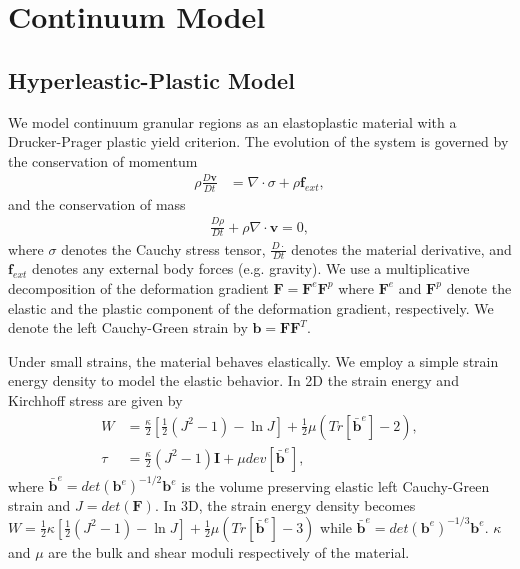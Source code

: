 \chapter{Continuum Model}

\section{Hyperleastic-Plastic Model} \label{hyperelastic_model}
We model continuum granular regions as an elastoplastic material with a Drucker-Prager plastic yield criterion. The evolution of the system is governed by the conservation of momentum
\begin{align}
\rho \frac{D \bm{v}}{D t} &= \nabla \cdot \sigma + \rho \bm{f}_{ext} ,
\end{align}
and the conservation of mass
\begin{align}
\frac{D \rho}{D t} + \rho \nabla \cdot \bm{v} = 0 ,
\end{align}
where $\sigma$ denotes the Cauchy stress tensor, $\frac{D \cdot}{D t}$ denotes the material derivative, and $\bm{f}_{ext}$ denotes any external body forces (e.g. gravity). We use a multiplicative decomposition of the deformation gradient $\boldsymbol{F} = \boldsymbol{F}^e \boldsymbol{F}^p$ where $\boldsymbol{F}^e$ and $\boldsymbol{F}^p$ denote the elastic and the plastic component of the deformation gradient, respectively. We denote the left Cauchy-Green strain by $\boldsymbol{b} = \boldsymbol{F} \boldsymbol{F}^T$.

Under small strains, the material behaves elastically. We employ a simple strain energy density to model the elastic behavior. In 2D the strain energy and Kirchhoff stress are given by
\begin{align}
W &= \frac{\kappa}{2} \left[ \frac{1}{2} ( J^2 - 1 ) - \ln J \right] + \frac{1}{2} \mu ( Tr[ \bar{\bm{b}}^e ] - 2 ) , \\
\tau &= \frac{\kappa}{2} \left( J^2 - 1 \right) \bm{I} + \mu dev[\bar{\bm{b}}^e] ,
\end{align}
where $\bar{\bm{b}}^e = det\left( \bm{b}^e \right)^{-1/2} \bm{b}^e$ is the volume preserving elastic left Cauchy-Green strain and $J = det\left( \bm{F} \right)$. In 3D, the strain energy density becomes $W = \frac{1}{2} \kappa \left[ \frac{1}{2} ( J^2 - 1 ) - \ln J \right] + \frac{1}{2} \mu ( Tr[ \bar{\bm{b}}^e ] - 3 )$ while $\bar{\bm{b}}^e = det\left( \bm{b}^e \right)^{-1/3} \bm{b}^e$. $\kappa$ and $\mu$ are the bulk and shear moduli respectively of the material.

